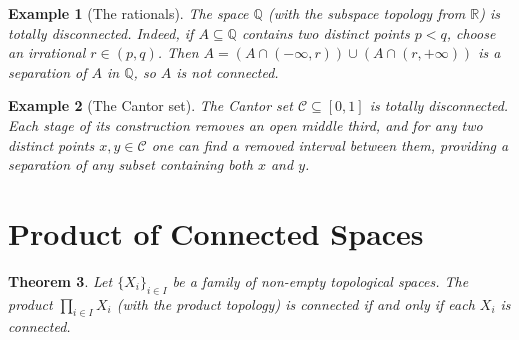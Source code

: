 \documentclass[11pt,a4paper,twoside]{book}
\newtheorem{theorem}{Theorem}[section]
\theoremstyle{remark}
\theoremstyle{definition}
\newtheorem{exampleplain}[theorem]{Example}
\theoremstyle{definition}
\newenvironment{example}[1][]{%
  \begin{exampleplain}[#1]\itshape
}{%
  \end{exampleplain}
}
\begin{document}
\begin{example}[The rationals]\label{ex:Q-totally-disconnected}
The space $\mathbb{Q}$ (with the subspace topology from $\mathbb{R}$)
is totally disconnected.  Indeed, if $A\subseteq\mathbb{Q}$ contains
two distinct points $p<q$, choose an irrational
$r\in(p,q)$.  Then $A=(A\cap(-\infty,r))\cup(A\cap(r,+\infty))$
is a separation of $A$ in $\mathbb{Q}$, so $A$ is not connected.
\end{example}

\begin{example}[The Cantor set]\label{ex:cantor-totally-disconnected}
The Cantor set $\mathcal{C}\subseteq[0,1]$ is totally disconnected.
Each stage of its construction removes an open middle third, and
for any two distinct points $x,y\in\mathcal{C}$ one can find a
removed interval between them, providing a separation of any
subset containing both $x$ and $y$.
\end{example}


\section{Product of Connected Spaces}
\label{sec:product-connected}

\begin{theorem}\label{thm:product-connected}
Let $\{X_i\}_{i\in I}$ be a family of non-empty topological spaces.
The product $\prod_{i\in I}X_i$ (with the product topology) is
connected if and only if each $X_i$ is connected.
\end{theorem}
\end{document}
